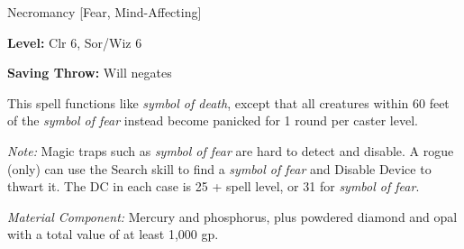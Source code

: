 
Necromancy [Fear, Mind-Affecting]

\textbf{Level:} Clr 6, Sor/Wiz 6

\textbf{Saving Throw:} Will negates

This spell functions like \textit{symbol of death}, except that all creatures within 
60 feet of the \textit{symbol of fear} instead become panicked for 1 round per 
caster level.

\textit{Note:} Magic traps such as \textit{symbol of fear} are hard to detect and 
disable. A rogue (only) can use the Search skill to find a \textit{symbol of fear 
}and Disable Device to thwart it. The DC in each case is 25 + spell level, or 31 
for \textit{symbol of fear}.

\textit{Material Component:} Mercury and phosphorus, plus powdered diamond and 
opal with a total value of at least 1,000 gp.

